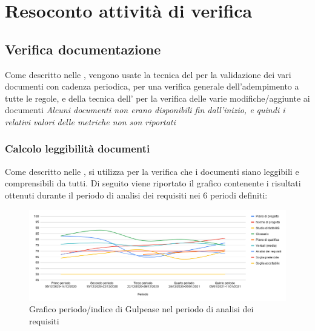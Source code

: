 
\section{Resoconto attività di verifica}

\subsection{Verifica documentazione}
 Come descritto nelle , vengono usate la tecnica del   per la validazione dei vari documenti con cadenza periodica, per una verifica generale dell'adempimento a tutte le regole, e della tecnica dell'  per la verifica delle varie modifiche/aggiunte ai documenti
\newline
\newline
\emph{Alcuni documenti non erano disponibili fin dall'inizio, e quindi i relativi valori delle metriche non son riportati}


\subsubsection{Calcolo leggibilità documenti}
Come descritto nelle , si utilizza  per la verifica che i documenti siano leggibili e comprensibili da tutti. 
Di seguito viene riportato il grafico contenente i risultati ottenuti durante il periodo di analisi dei requisiti nei 6 periodi definiti:

\begin{figure}[H]
	\centering
	\includegraphics[width=0.8\linewidth]{./res/images/gulpease.png}
	\caption{Grafico periodo/indice di Gulpease nel periodo di analisi dei requisiti}
	\label{fig:Grafico indice di Gulpease periodo di analisi dei requisiti}
\end{figure}

